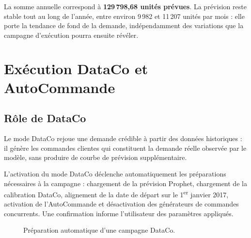 \documentclass[11pt,a4paper]{article}
\newcommand{\code}[1]{\texttt{#1}}
\begin{document}
La somme annuelle correspond à \textbf{129\,798,68 unités prévues}. La prévision reste stable tout au long de l'année, entre environ 9\,982 et 11\,207 unités par mois : elle porte la tendance de fond de la demande, indépendamment des variations que la campagne d'exécution pourra ensuite révéler.

\section{Exécution DataCo et AutoCommande}
\label{sec:autocommande}

\subsection{Rôle de DataCo}

Le mode DataCo rejoue une demande crédible à partir des données historiques : il génère les commandes clientes qui constituent la demande réelle observée par le modèle, sans produire de courbe de prévision supplémentaire.

L'activation du mode DataCo déclenche automatiquement les préparations nécessaires à la campagne : chargement de la prévision Prophet, chargement de la calibration DataCo, alignement de la date de départ sur le 1\textsuperscript{er} janvier 2017, activation de l'AutoCommande et désactivation des générateurs de commandes concurrents. Une confirmation informe l'utilisateur des paramètres appliqués.

\begin{figure}[htbp]
\centering
{}
\caption{Préparation automatique d'une campagne DataCo.}
\end{figure}
\end{document}
